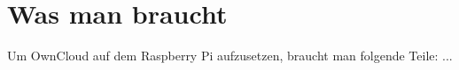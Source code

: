 \section{Was man braucht}
Um OwnCloud auf dem Raspberry Pi aufzusetzen, braucht man folgende Teile: ...
